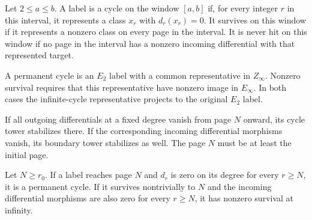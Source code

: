 \begin{definition}
\label{sem:SpectralSequence:permanent}
Let $2\leq a\leq b$. A label is a cycle on the window $[a,b]$ if, for every integer $r$ in this interval, it represents a class $x_r$ with $d_r(x_r)=0$. It survives on this window if it represents a nonzero class on every page in the interval. It is never hit on this window if no page in the interval has a nonzero incoming differential with that represented target.

A permanent cycle is an $E_2$ label with a common representative in $Z_\infty$. Nonzero survival requires that this representative have nonzero image in $E_\infty$. In both cases the infinite-cycle representative projects to the original $E_2$ label.

If all outgoing differentials at a fixed degree vanish from page $N$ onward, its cycle tower stabilizes there. If the corresponding incoming differential morphisms vanish, its boundary tower stabilizes as well. The page $N$ must be at least the initial page.

Let $N\geq r_0$. If a label reaches page $N$ and $d_r$ is zero on its degree for every $r\geq N$, it is a permanent cycle. If it survives nontrivially to $N$ and the incoming differential morphisms are also zero for every $r\geq N$, it has nonzero survival at infinity.
\end{definition}


